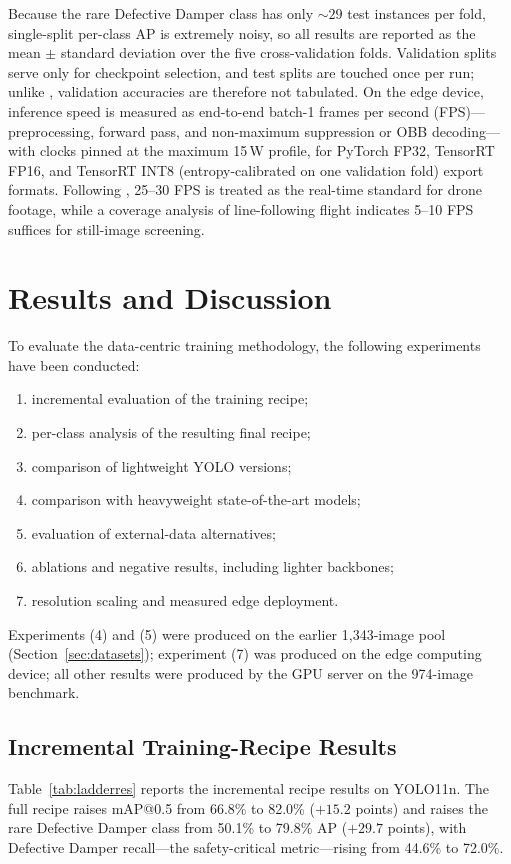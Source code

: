 \documentclass[conference]{IEEEtran}
\makeatletter
\newcommand{\dd}{Defective Damper}
\newcommand{\map}{mAP@0.5}
\makeatother
\begin{document}
Because the rare \dd{} class has only ${\sim}29$ test instances per fold, single-split per-class AP is extremely noisy, so all results are reported as the mean $\pm$ standard deviation over the five cross-validation folds. Validation splits serve only for checkpoint selection, and test splits are touched once per run; unlike \cite{vazquez2024wildfire,vazquez2026wildfire}, validation accuracies are therefore not tabulated. On the edge device, inference speed is measured as end-to-end batch-1 frames per second (FPS)---preprocessing, forward pass, and non-maximum suppression or OBB decoding---with clocks pinned at the maximum 15\,W profile, for PyTorch FP32, TensorRT FP16, and TensorRT INT8 (entropy-calibrated on one validation fold) export formats. Following \cite{vazquez2026wildfire}, 25--30 FPS is treated as the real-time standard for drone footage, while a coverage analysis of line-following flight indicates 5--10 FPS suffices for still-image screening.

\section{Results and Discussion}
\label{sec:results}

To evaluate the data-centric training methodology, the following experiments have been conducted:
\begin{enumerate}
\item incremental evaluation of the training recipe;
\item per-class analysis of the resulting final recipe;
\item comparison of lightweight YOLO versions;
\item comparison with heavyweight state-of-the-art models;
\item evaluation of external-data alternatives;
\item ablations and negative results, including lighter backbones;
\item resolution scaling and measured edge deployment.
\end{enumerate}
Experiments (4) and (5) were produced on the earlier 1{,}343-image pool (Section~\ref{sec:datasets}); experiment (7) was produced on the edge computing device; all other results were produced by the GPU server on the 974-image benchmark.

\subsection{Incremental Training-Recipe Results}
\label{sec:ladder}
Table~\ref{tab:ladderres} reports the incremental recipe results on YOLO11n. The full recipe raises \map{} from 66.8\% to 82.0\% ($+15.2$ points) and raises the rare \dd{} class from 50.1\% to 79.8\% AP ($+29.7$ points), with \dd{} recall---the safety-critical metric---rising from 44.6\% to 72.0\%.
\end{document}

